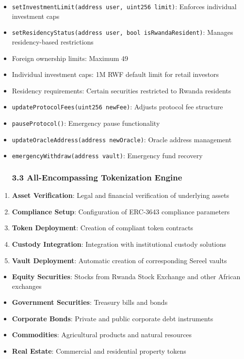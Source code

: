 \documentclass[12pt]{article}
\begin{document}
{{{\begin{itemize}
	\item \lstinline{setInvestmentLimit(address user, uint256 limit)}: Enforces individual investment caps
	\item \lstinline{setResidencyStatus(address user, bool isRwandaResident)}: Manages residency-based restrictions
	\item Foreign ownership limits: Maximum 49%
	\item Individual investment caps: 1M RWF default limit for retail investors
	\item Residency requirements: Certain securities restricted to Rwanda residents
	\item \lstinline{updateProtocolFees(uint256 newFee)}: Adjusts protocol fee structure
	\item \lstinline{pauseProtocol()}: Emergency pause functionality
	\item \lstinline{updateOracleAddress(address newOracle)}: Oracle address management
	\item \lstinline{emergencyWithdraw(address vault)}: Emergency fund recovery
\subsubsection{3.3 All-Encompassing Tokenization Engine} %

\end{itemize}
\begin{enumerate}
	\item \textbf{Asset Verification}: Legal and financial verification of underlying assets
	\item \textbf{Compliance Setup}: Configuration of ERC-3643 compliance parameters
	\item \textbf{Token Deployment}: Creation of compliant token contracts
	\item \textbf{Custody Integration}: Integration with institutional custody solutions
	\item \textbf{Vault Deployment}: Automatic creation of corresponding Sereel vaults

\end{enumerate}
\begin{itemize}
	\item \textbf{Equity Securities}: Stocks from Rwanda Stock Exchange and other African exchanges
	\item \textbf{Government Securities}: Treasury bills and bonds
	\item \textbf{Corporate Bonds}: Private and public corporate debt instruments
	\item \textbf{Commodities}: Agricultural products and natural resources
	\item \textbf{Real Estate}: Commercial and residential property tokens


\end{itemize}}}}
\end{document}
